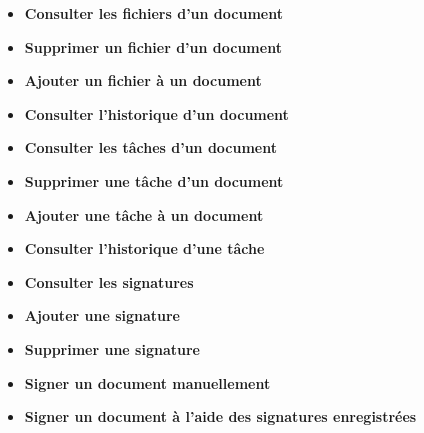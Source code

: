 \begin{itemize}
\item \textbf{Consulter les fichiers d'un document}
\item \textbf{Supprimer un fichier d'un document}
\item \textbf{Ajouter un fichier à un document}
\item \textbf{Consulter l'historique d'un document}
\item \textbf{Consulter les tâches d'un document}
\item \textbf{Supprimer une tâche d'un document}
\item \textbf{Ajouter une tâche à un document}
\item \textbf{Consulter l'historique d'une tâche}
\item \textbf{Consulter les signatures}
\item \textbf{Ajouter une signature}
\item \textbf{Supprimer une signature}
\item \textbf{Signer un document manuellement}
\item \textbf{Signer un document à l'aide des signatures enregistrées}

\end{itemize}





